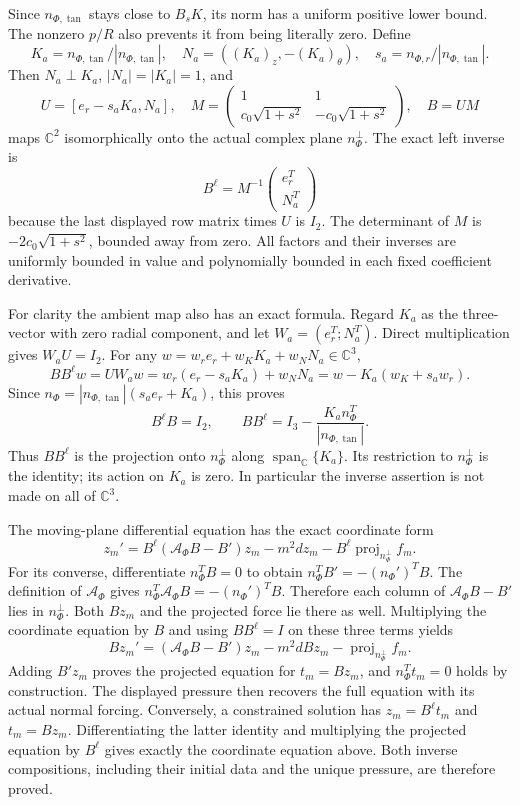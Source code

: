 \documentclass[10pt,a4paper]{article}
\newcommand{\N}{\mathcal N_K}
\begin{document}
Since \(n_{\Phi,\tan}\) stays close to \(B_sK\), its norm has a uniform positive lower bound. The nonzero \(p/R\) also prevents it from being literally zero. Define \[
K_a=n_{\Phi,\tan}/|n_{\Phi,\tan}|,\quad
N_a=((K_a)_z,-(K_a)_\theta),\quad
s_a=n_{\Phi,r}/|n_{\Phi,\tan}|.
\] Then \(N_a\perp K_a\), \(|N_a|=|K_a|=1\), and \[
U=[e_r-s_aK_a,N_a],\quad
M=\begin{pmatrix}1&1\\c_0\sqrt{1+s^2}&-c_0\sqrt{1+s^2}\end{pmatrix},
\quad B=UM
\] maps \(\mathbb C^2\) isomorphically onto the actual complex plane \(n_\Phi^\perp\). The exact left inverse is \[
B^\ell=M^{-1}\begin{pmatrix}e_r^T\\N_a^T\end{pmatrix}
\] because the last displayed row matrix times \(U\) is \(I_2\). The determinant of \(M\) is \(-2c_0\sqrt{1+s^2}\), bounded away from zero. All factors and their inverses are uniformly bounded in value and polynomially bounded in each fixed coefficient derivative.

For clarity the ambient map also has an exact formula. Regard \(K_a\)
as the three-vector with zero radial component, and let
\(W_a=(e_r^T;N_a^T)\). Direct multiplication gives \(W_aU=I_2\).
For any \(w=w_re_r+w_KK_a+w_NN_a\in\mathbb C^3\),
\[
BB^\ell w=UW_aw=w_r(e_r-s_aK_a)+w_NN_a
=w-K_a(w_K+s_aw_r).
\]
Since \(n_\Phi=|n_{\Phi,\tan}|(s_ae_r+K_a)\), this proves
\[
B^\ell B=I_2,\qquad
BB^\ell=I_3-\frac{K_an_\Phi^T}{|n_{\Phi,\tan}|}.
\]
Thus \(BB^\ell\) is the projection onto \(n_\Phi^\perp\)
along \(\operatorname{span}_{\mathbb C}\{K_a\}\). Its restriction
to \(n_\Phi^\perp\) is the identity; its action on \(K_a\) is zero.
In particular the inverse assertion is not made on all of \(\mathbb C^3\).

The moving-plane differential equation has the exact coordinate form
\[
z_m'=B^\ell(\mathcal A_\Phi B-B')z_m-m^2dz_m
-B^\ell\operatorname{proj}_{n_\Phi^\perp}f_m.
\]
For its converse, differentiate \(n_\Phi^TB=0\) to obtain
\(n_\Phi^TB'=-(n_\Phi')^TB\). The definition of
\(\mathcal A_\Phi\) gives
\(n_\Phi^T\mathcal A_\Phi B=-(n_\Phi')^TB\).
Therefore each column of \(\mathcal A_\Phi B-B'\) lies in
\(n_\Phi^\perp\). Both \(Bz_m\) and the projected force lie there
as well. Multiplying the coordinate equation by \(B\) and using
\(BB^\ell=I\) on these three terms yields
\[
Bz_m'=(\mathcal A_\Phi B-B')z_m-m^2dBz_m
-\operatorname{proj}_{n_\Phi^\perp}f_m.
\]
Adding \(B'z_m\) proves the projected equation for \(t_m=Bz_m\),
and \(n_\Phi^Tt_m=0\) holds by construction. The displayed pressure
then recovers the full equation with its actual normal forcing.
Conversely, a constrained solution has \(z_m=B^\ell t_m\) and
\(t_m=Bz_m\). Differentiating the latter identity and multiplying
the projected equation by \(B^\ell\) gives exactly the coordinate
equation above. Both inverse compositions, including their initial
data and the unique pressure, are therefore proved.
\end{document}
